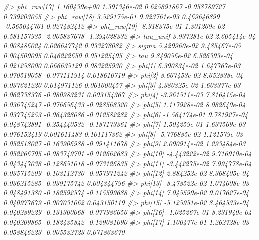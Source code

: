 \documentclass[
]{article}
\newenvironment{Shaded}{\begin{snugshade}}{\end{snugshade}}
\newcommand{\CommentTok}[1]{\textcolor[rgb]{0.56,0.35,0.01}{\textit{#1}}}
\begin{document}
\begin{Shaded}
\begin{Highlighting}[]
\CommentTok{\#\textgreater{} phi\_raw[17]  1.160439e+00 1.391346e{-}02 0.625891867  {-}0.058789727   0.739203055}
\CommentTok{\#\textgreater{} phi\_raw[18]  3.529175e{-}01 9.923761e{-}03 0.469646899  {-}0.565044761   0.027482412}
\CommentTok{\#\textgreater{} phi\_raw[19] {-}8.918375e{-}01 1.301269e{-}02 0.581157935  {-}2.005837678  {-}1.294028332}
\CommentTok{\#\textgreater{} tau\_unif     3.937281e{-}02 2.605414e{-}04 0.008486024   0.026647742   0.033278082}
\CommentTok{\#\textgreater{} sigma        5.429960e{-}02 9.485467e{-}05 0.004509095   0.046222650   0.051225495}
\CommentTok{\#\textgreater{} tau          9.849056e{-}02 6.526393e{-}04 0.021258000   0.066635129   0.083225930}
\CommentTok{\#\textgreater{} phi[1]       6.390834e{-}02 1.647767e{-}03 0.070519058  {-}0.077111914   0.018610719}
\CommentTok{\#\textgreater{} phi[2]       8.667453e{-}02 8.652838e{-}04 0.037621220   0.014971126   0.061600457}
\CommentTok{\#\textgreater{} phi[3]       4.380325e{-}02 1.603377e{-}03 0.062738376  {-}0.080983231   0.003154367}
\CommentTok{\#\textgreater{} phi[4]      {-}3.961511e{-}03 7.816415e{-}04 0.036745247  {-}0.076656433  {-}0.028568320}
\CommentTok{\#\textgreater{} phi[5]       1.117928e{-}02 8.082640e{-}04 0.037745253  {-}0.064328086  {-}0.012582282}
\CommentTok{\#\textgreater{} phi[6]      {-}1.564174e{-}01 9.781927e{-}04 0.048742891  {-}0.254440532  {-}0.187173361}
\CommentTok{\#\textgreater{} phi[7]       1.504259e{-}01 1.637569e{-}03 0.076152419   0.001611483   0.101117362}
\CommentTok{\#\textgreater{} phi[8]      {-}5.776885e{-}02 1.121579e{-}03 0.052518027  {-}0.163906988  {-}0.091411678}
\CommentTok{\#\textgreater{} phi[9]       2.090914e{-}02 1.293484e{-}03 0.052266795  {-}0.083749701  {-}0.012662683}
\CommentTok{\#\textgreater{} phi[10]     {-}4.443222e{-}02 9.716910e{-}04 0.043447038  {-}0.128651018  {-}0.073126835}
\CommentTok{\#\textgreater{} phi[11]     {-}3.442275e{-}02 7.994778e{-}04 0.035715209  {-}0.103112730  {-}0.057971242}
\CommentTok{\#\textgreater{} phi[12]      2.884252e{-}02 8.368405e{-}04 0.036215285  {-}0.039175742   0.004344796}
\CommentTok{\#\textgreater{} phi[13]     {-}8.478522e{-}02 1.074608e{-}03 0.048491380  {-}0.182592574  {-}0.115599688}
\CommentTok{\#\textgreater{} phi[14]      7.045599e{-}02 9.017627e{-}04 0.040977679  {-}0.007031062   0.043150119}
\CommentTok{\#\textgreater{} phi[15]     {-}5.125951e{-}02 8.464533e{-}04 0.040289229  {-}0.131300068  {-}0.077986656}
\CommentTok{\#\textgreater{} phi[16]     {-}1.025267e{-}01 8.231940e{-}04 0.040209865  {-}0.182435842  {-}0.129081090}
\CommentTok{\#\textgreater{} phi[17]      1.100477e{-}01 1.262728e{-}03 0.058846223  {-}0.005532723   0.071863670}

\end{Highlighting}
\end{Shaded}
\end{document}
